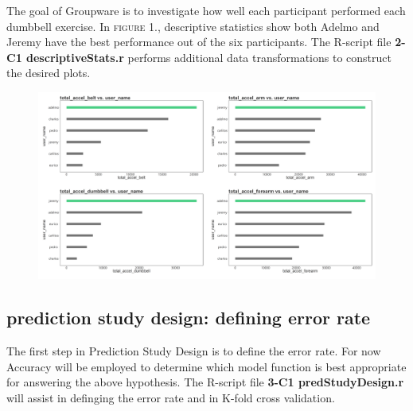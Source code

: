 \documentclass[10pt, twoside]{article}
\begin{document}
\noindent
The goal of Groupware is to investigate how well each participant performed each dumbbell
exercise. In \textsc{figure 1.}, descriptive statistics show both Adelmo and Jeremy have the best
performance out of the six participants. The R-script file \textbf{2-C1 descriptiveStats.r} performs
additional data transformations to construct the desired plots.
\bigskip

\begin{figure}[H]
\centering
\includegraphics[scale=0.359]{plot1}
\caption{}
\end{figure}

\begin{center}
\subsection{prediction study design: defining error rate}
\vspace{-3ex}
\end{center}

\noindent
The first step in Prediction Study Design is to define the error rate. For now
Accuracy will be employed to determine which model function is best appropriate for
answering the above hypothesis. The R-script file \textbf{3-C1 predStudyDesign.r} will assist
in definging the error rate and in K-fold cross validation.
\smallskip
\end{document}
